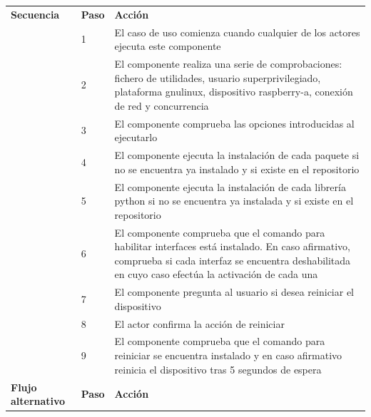 \documentclass[12pt,a4paper, twoside]{report}
\begin{document}
\begin{longtable}{|p{3cm}|p{1cm}|p{12.5cm}|}
		{\cellcolor{Gainsboro}\textbf{Secuencia}} & \textbf{Paso} & \textbf{Acción}  \\ \cline{2-3} 
		\cellcolor{Gainsboro} & 1 & El caso de uso comienza cuando cualquier de los actores ejecuta este componente \\ \cline{2-3} 
		\cellcolor{Gainsboro} & 2 & El componente realiza una serie de comprobaciones: fichero de utilidades, usuario superprivilegiado, plataforma \gls{gnulinux}, dispositivo \gls{raspberry-a}, conexión de red y concurrencia \\ \cline{2-3} 
		\cellcolor{Gainsboro} & 3 & El componente comprueba las opciones introducidas al ejecutarlo \\ \cline{2-3} 
		\cellcolor{Gainsboro} & 4 & El componente ejecuta la instalación de cada paquete si no se encuentra ya instalado y si existe en el repositorio \\ \cline{2-3} 
		\cellcolor{Gainsboro} & 5 & El componente ejecuta la instalación de cada librería \gls{python} si no se encuentra ya instalada y si existe en el repositorio \\ \cline{2-3} 
		\cellcolor{Gainsboro} & 6 & El componente comprueba que el comando para habilitar interfaces está instalado. En caso afirmativo, comprueba si cada interfaz se encuentra deshabilitada en cuyo caso efectúa la activación de cada una \\ \cline{2-3} 
		\cellcolor{Gainsboro} & 7 & El componente pregunta al usuario si desea reiniciar el dispositivo \\ \cline{2-3} 
		\cellcolor{Gainsboro} & 8 & El actor confirma la acción de reiniciar \\ \cline{2-3} 
		\cellcolor{Gainsboro} & 9 & El componente comprueba que el comando para reiniciar se encuentra instalado y en caso afirmativo reinicia el dispositivo tras 5 segundos de espera \\ \hline

		{\cellcolor{Gainsboro}\textbf{Flujo alternativo}} & \textbf{Paso} & \textbf{Acción}  	\\ \cline{2-3} 
				

\end{longtable}
\end{document}
